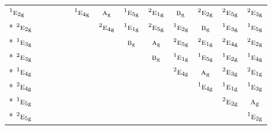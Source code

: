 \documentclass[10pt,a4paper]{article}
\numberwithin{equation}{section}
\newcommand{\irr}[1]{\text{\normalfont\scshape #1}}
\newcommand{\conjpair}[1]{{}^{#1}}
\newcommand{\ptag}[1]{\mathrm{#1}}
\begin{document}
{\begin{longtable}{@{}lcccccccccccc@{}}
$\conjpair{1}\irr{e}_{2\ptag{g}}$ &  &  &  &  & $\conjpair{1}\irr{e}_{4\ptag{g}}$ & $\irr{a}_{\ptag{g}}$ & $\conjpair{1}\irr{e}_{5\ptag{g}}$ & $\conjpair{2}\irr{e}_{1\ptag{g}}$ & $\irr{b}_{\ptag{g}}$ & $\conjpair{2}\irr{e}_{2\ptag{g}}$ & $\conjpair{2}\irr{e}_{5\ptag{g}}$ & $\conjpair{2}\irr{e}_{3\ptag{g}}$\\*
$\conjpair{2}\irr{e}_{2\ptag{g}}$ &  &  &  &  &  & $\conjpair{2}\irr{e}_{4\ptag{g}}$ & $\conjpair{1}\irr{e}_{1\ptag{g}}$ & $\conjpair{2}\irr{e}_{5\ptag{g}}$ & $\conjpair{1}\irr{e}_{2\ptag{g}}$ & $\irr{b}_{\ptag{g}}$ & $\conjpair{1}\irr{e}_{3\ptag{g}}$ & $\conjpair{1}\irr{e}_{5\ptag{g}}$\\*
$\conjpair{1}\irr{e}_{3\ptag{g}}$ &  &  &  &  &  &  & $\irr{b}_{\ptag{g}}$ & $\irr{a}_{\ptag{g}}$ & $\conjpair{2}\irr{e}_{5\ptag{g}}$ & $\conjpair{2}\irr{e}_{1\ptag{g}}$ & $\conjpair{2}\irr{e}_{4\ptag{g}}$ & $\conjpair{2}\irr{e}_{2\ptag{g}}$\\*
$\conjpair{2}\irr{e}_{3\ptag{g}}$ &  &  &  &  &  &  &  & $\irr{b}_{\ptag{g}}$ & $\conjpair{1}\irr{e}_{1\ptag{g}}$ & $\conjpair{1}\irr{e}_{5\ptag{g}}$ & $\conjpair{1}\irr{e}_{2\ptag{g}}$ & $\conjpair{1}\irr{e}_{4\ptag{g}}$\\*
$\conjpair{1}\irr{e}_{4\ptag{g}}$ &  &  &  &  &  &  &  &  & $\conjpair{2}\irr{e}_{4\ptag{g}}$ & $\irr{a}_{\ptag{g}}$ & $\conjpair{2}\irr{e}_{3\ptag{g}}$ & $\conjpair{2}\irr{e}_{1\ptag{g}}$\\*
$\conjpair{2}\irr{e}_{4\ptag{g}}$ &  &  &  &  &  &  &  &  &  & $\conjpair{1}\irr{e}_{4\ptag{g}}$ & $\conjpair{1}\irr{e}_{1\ptag{g}}$ & $\conjpair{1}\irr{e}_{3\ptag{g}}$\\*
$\conjpair{1}\irr{e}_{5\ptag{g}}$ &  &  &  &  &  &  &  &  &  &  & $\conjpair{2}\irr{e}_{2\ptag{g}}$ & $\irr{a}_{\ptag{g}}$\\*
$\conjpair{2}\irr{e}_{5\ptag{g}}$ &  &  &  &  &  &  &  &  &  &  &  & $\conjpair{1}\irr{e}_{2\ptag{g}}$\\
\bottomrule\end{longtable}}
\end{document}
